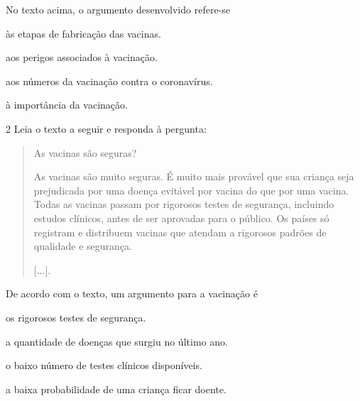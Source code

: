 No texto acima, o argumento desenvolvido refere-se

\begin{escolha}
\item às etapas de fabricação das vacinas.

\item aos perigos associados à vacinação.

\item aos números da vacinação contra o coronavírus.

\item à importância da vacinação.
\end{escolha}


\num{2} Leia o texto a seguir e responda à pergunta:

\begin{quote}
As vacinas são seguras?

As vacinas são muito seguras. É muito mais provável que sua criança seja
prejudicada por uma doença evitável por vacina do que por uma vacina.
Todas as vacinas passam por rigorosos testes de segurança, incluindo
estudos clínicos, antes de ser aprovadas para o público. Os países só
registram e distribuem vacinas que atendam a rigorosos padrões de
qualidade e segurança.

{[}...{]}.

\end{quote}

De acordo com o texto, um argumento para a vacinação é

\begin{escolha}
\item os rigorosos testes de segurança.

\item a quantidade de doenças que surgiu no último ano.

\item o baixo número de testes clínicos disponíveis.

\item a baixa probabilidade de uma criança ficar doente.
\end{escolha}

